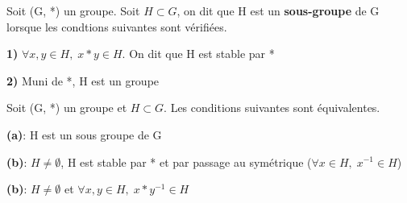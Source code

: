 \documentclass[a4paper, 12pt]{article}
\begin{document}
\begin{definition}
    Soit (G, *) un groupe. Soit $H \subset G$, on dit que H est un \textbf{sous-groupe} de G lorsque les condtions suivantes sont vérifiées.
    \item \textbf{1)} $\forall x, y \in H, \; x * y \in H$. On dit que H est stable par *
    \item \textbf{2)} Muni de *, H est un groupe
\end{definition}

\begin{proposition}
    Soit (G, *) un groupe et $H \subset G$. Les conditions suivantes sont équivalentes.

    \item \textbf{(a)}: H est un sous groupe de G
    \item \textbf{(b)}: $H \neq \emptyset$, H est stable par * et par passage au symétrique ($\forall x \in H, \; x^{-1} \in H$)
    \item \textbf{(b)}: $H \neq \emptyset$ et $\forall x, y \in H, \; x * y^{-1} \in H$
\end{proposition}
\end{document}

